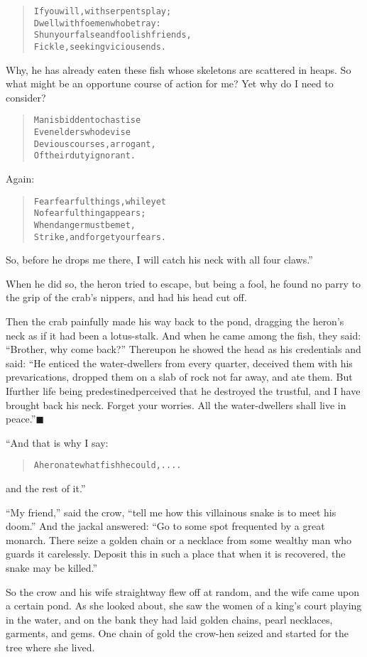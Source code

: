 \documentclass[article, twoside, 14pt]{memoir}
\newcommand{\qed}{\hfill \ensuremath{\blacksquare}}
\renewenvironment{verbatim}{%
\begin{quote}%
\vskip -10pt%
\begin{alltt}\normalfont\large}{\end{alltt}%
\end{quote}%
\vskip -10pt
} %
\begin{document}
\begin{verbatim}
If you will, with serpents play;
Dwell with foemen who betray:
Shun your false and foolish friends,
Fickle, seeking vicious ends.
\end{verbatim}
Why, he has already eaten these fish whose skeletons are scattered
in heaps. So what might be an opportune course of action for me?
Yet why do I need to consider?

\begin{verbatim}
Man is bidden to chastise
Even elders who devise
Devious courses, arrogant,
Of their duty ignorant.
\end{verbatim}
Again:

\begin{verbatim}
Fear fearful things, while yet
    No fearful thing appears;
When danger must be met,
    Strike, and forget your fears.
\end{verbatim}
So, before he drops me there, I will catch his neck with all four
claws.”

When he did so, the heron tried to escape, but being a fool, he
found no parry to the grip of the crab's nippers, and had his head
cut off.

Then the crab painfully made his way back to the pond, dragging the
heron's neck as if it had been a lotus-stalk. And when he came
among the fish, they said: ``Brother, why come back?'' Thereupon he
showed the head as his credentials and said:
``He enticed the water-dwellers from every quarter, deceived them with his prevarications, dropped them on a slab of rock not far away, and ate them. But I{\textemdash}further life being predestined{\textemdash}perceived that he destroyed the trustful, and I have brought back his neck. Forget your worries. All the water-dwellers shall live in peace.''\hyperref[s9]{\qed}

“And that is why I say:

\begin{verbatim}
A heron ate what fish he could, ....
\end{verbatim}
and the rest of it.”

``My friend,'' said the crow,
``tell me how this villainous snake is to meet his doom.'' And the
jackal answered:
``Go to some spot frequented by a great monarch. There seize a golden chain or a necklace from some wealthy man who guards it carelessly. Deposit this in such a place that when it is recovered, the snake may be killed.''

So the crow and his wife straightway flew off at random, and the
wife came upon a certain pond. As she looked about, she saw the
women of a king's court playing in the water, and on the bank they
had laid golden chains, pearl necklaces, garments, and gems. One
chain of gold the crow-hen seized and started for the tree where
she lived.
\end{document}
